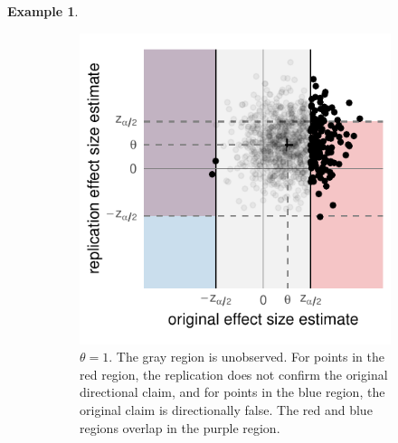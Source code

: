 \documentclass[11pt]{article}
\theoremstyle{definition}
\newtheorem{example}{Example}
\theoremstyle{custom}
\begin{document}
\begin{example}
\begin{figure}[htbp]
\begin{subfigure}[t]{0.39\hsize}
	      \centering
	      \includegraphics[width=\hsize]{naive-same-dir-theta1}
	      \caption{$\theta=1$. The gray region is unobserved. For points in the red region, the replication does not confirm the original directional claim, and for points in the blue region, the original claim is directionally false. The red and blue regions overlap in the purple region.}
	    \label{fig:naive-same-dir-theta1}
	    \end{subfigure}
	    \caption{}
	  \label{fig:naive-same-dir}
	  \end{figure}


\end{example}
\end{document}
